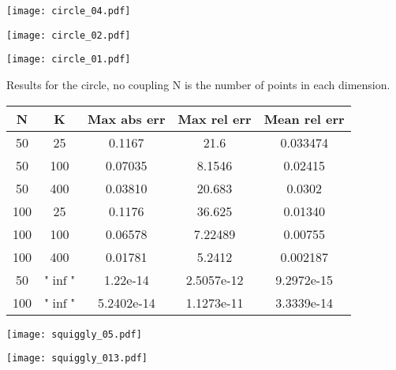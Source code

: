 \documentclass{beamer}
\begin{document}
\begin{frame}
	\begin{centering}
	\texttt{[image: circle\_04.pdf]}
	\end{centering}
\end{frame}
\begin{frame}
	\begin{centering}
	\texttt{[image: circle\_02.pdf]}
	\end{centering}
\end{frame}
\begin{frame}
	\begin{centering}
	\texttt{[image: circle\_01.pdf]}
	\end{centering}
\end{frame}

\begin{frame}
Results for the circle, no coupling
N is the number of points in each dimension.

\begin{center}
\begin{tabular}{|c|c|c|c|c|}
	\hline
	N & K & Max abs err & Max rel err & Mean rel err \\  
	\hline 
	50 & 25 & 0.1167 & 21.6 & 0.033474 \\
	50 & 100 & 0.07035 & 8.1546 & 0.02415 \\
	50 & 400 & 0.03810 & 20.683& 0.0302 \\
	100 & 25 & 0.1176 & 36.625 & 0.01340 \\
	100 & 100 & 0.06578 & 7.22489 & 0.00755 \\
	100 & 400 & 0.01781 & 5.2412 & 0.002187 \\
	50 & "$\inf$" & 1.22e-14 & 2.5057e-12 & 9.2972e-15 \\
	100 & "$\inf$" & 5.2402e-14 & 1.1273e-11 & 3.3339e-14 \\
	\hline
\end{tabular}
\end{center}
\end{frame}


\begin{frame}
	\begin{centering}
	\texttt{[image: squiggly\_05.pdf]}
	\end{centering}
\end{frame}
\begin{frame}
	\begin{centering}
	\texttt{[image: squiggly\_013.pdf]}
	\end{centering}
\end{frame}
\end{document}
